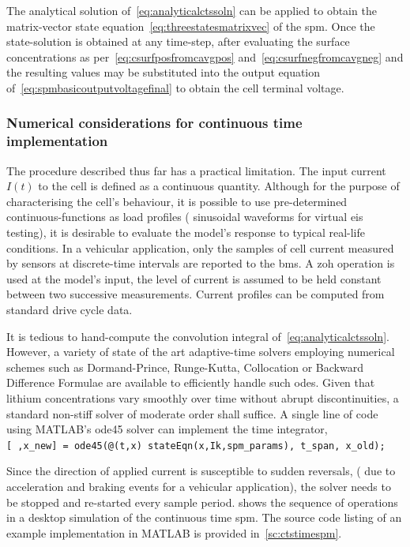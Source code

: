 The  analytical  solution  of~\cref{eq:analyticalctssoln}   can  be  applied  to
obtain  the matrix-vector  state equation~\cref{eq:threestatesmatrixvec}  of the
\gls{spm}.  Once  the  state-solution  is   obtained  at  any  time-step,  after
evaluating  the  surface   concentrations  as  per~\cref{eq:csurfposfromcavgpos}
and~\cref{eq:csurfnegfromcavgneg} and  the resulting  values may  be substituted
into the  output equation of~\cref{eq:spmbasicoutputvoltagefinal} to  obtain the
cell terminal voltage.

\subsubsection*{Numerical considerations for continuous time implementation}

The procedure described  thus far has a practical limitation.  The input current
$I(t)$ to the cell is defined as a continuous quantity. Although for the purpose
of characterising  the cell's  behaviour, it is  possible to  use pre-determined
continuous-functions as  load profiles  (\eg{} sinusoidal waveforms  for virtual
\gls{eis} testing), it is desirable to  evaluate the model's response to typical
real-life  conditions. In  a vehicular  application,  only the  samples of  cell
current  measured by  sensors at  discrete-time  intervals are  reported to  the
\gls{bms}. A \gls{zoh}  operation is used at the model's  input, \ie{} the level
of current is  assumed to be held constant between  two successive measurements.
Current profiles can be computed from standard drive cycle data.

It     is    tedious     to     hand-compute     the    convolution     integral
of~\cref{eq:analyticalctssoln}.  However,   a  variety  of  state   of  the  art
adaptive-time  solvers  employing  numerical  schemes  such  as  Dormand-Prince,
Runge-Kutta,  Collocation  or  Backward  Difference Formulae  are  available  to
efficiently  handle  such \gls{ode}s.  Given  that  lithium concentrations  vary
smoothly over time  without abrupt discontinuities, a  standard non-stiff solver
of moderate order  shall suffice. A single line of code  using MATLAB's ode45
solver can implement the time integrator, \eg{} \\ \texttt{[~,x_new] =
ode45(@(t,x) stateEqn(x,Ik,spm_params), t_span, x_old); }

Since  the direction  of applied  current  is susceptible  to sudden  reversals,
(\eg{}  due to  acceleration and  braking events  for a  vehicular application),
the  solver   needs  to   be  stopped  and   re-started  every   sample  period.
 shows the  sequence of operations in  a desktop simulation
of  the  continuous time  \gls{spm}.  The  source  code  listing of  an  example
implementation in MATLAB is provided in~\cref{sc:ctstimespm}.

